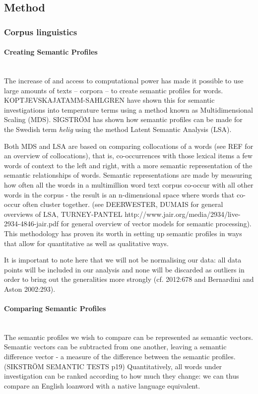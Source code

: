 \documentclass[a4paper]{article}
\begin{document}

\subsection{Method}


\subsubsection{Corpus linguistics}

\paragraph{Creating Semantic Profiles} \hspace{0pt} \\
The increase of and access to computational power has made it possible to use large amounts of texts -- corpora -- to create semantic profiles for words. KOPTJEVSKAJATAMM-SAHLGREN have shown this for semantic investigations into temperature terms using a method known as Multidimensional Scaling (MDS). SIGSTR\"OM has shown how semantic profiles can be made for the Swedish term \textit{helig} using the method Latent Semantic Analysis (LSA). 

Both MDS and LSA are based on comparing collocations of a words (see REF for an overview of collocations), that is, co-occurrences with those lexical items a few words of context to the left and right, with a more semantic representation of the semantic relationships of words. Semantic representations are made by measuring how often all the words in a multimillion word text corpus co-occur with all other words in the corpus - the result is an n-dimensional space where words that co-occur often cluster together. (see DEERWESTER, DUMAIS for general overviews of LSA, TURNEY-PANTEL http://www.jair.org/media/2934/live-2934-4846-jair.pdf for general overview of vector models for semantic processing). This methodology has proven its worth in setting up semantic profiles in ways that allow for quantitative as well as qualitative ways.

It is important to note here that we will not be normalising our data: all data points will be included in our analysis and none will be discarded as outliers in order to bring out the generalities more strongly (cf. \cite{Walchli2012} 2012:678 and Bernardini and Aston 2002:293).

\paragraph{Comparing Semantic Profiles} \hspace{0pt} \\
The semantic profiles we wish to compare can be represented as semantic vectors. Semantic vectors can be subtracted from one another, leaving a semantic difference vector - a measure of the difference between the semantic profiles.(SIKSTRÖM SEMANTIC TESTS p19) Quantitatively, all words under investigation can be ranked according to how much they change: we can thus compare an English loanword with a native language equivalent. 
\end{document}

